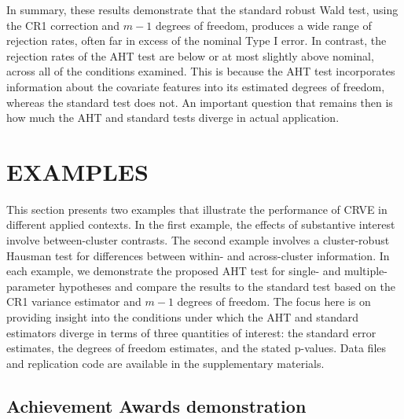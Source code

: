 \documentclass[12pt]{article}\usepackage[]{graphicx}\usepackage[]{color}
\begin{document}
In summary, these results demonstrate that the standard robust Wald test, using the CR1 correction and $m - 1$ degrees of freedom, produces a wide range of rejection rates, often far in excess of the nominal Type I error. 
In contrast, the rejection rates of the AHT test are below or at most slightly above nominal, across all of the conditions examined.
This is because the AHT test incorporates information about the covariate features into its estimated degrees of freedom, whereas the standard test does not.
An important question that remains then is how much the AHT and standard tests diverge in actual application.

\section{EXAMPLES}
\label{sec:examples}

This section presents two examples that illustrate the performance of CRVE in different applied contexts. 
In the first example, the effects of substantive interest involve between-cluster contrasts. 
The second example involves a cluster-robust Hausman test for differences between within- and across-cluster information. 
In each example, we demonstrate the proposed AHT test for single- and multiple-parameter hypotheses and compare the results to the standard test based on the CR1 variance estimator and $m - 1$ degrees of freedom. 
The focus here is on providing insight into the conditions under which the AHT and standard estimators diverge in terms of three quantities of interest: the standard error estimates, the degrees of freedom estimates, and the stated p-values. 
Data files and replication code are available in the supplementary materials.

\subsection{Achievement Awards demonstration} 
\end{document}
